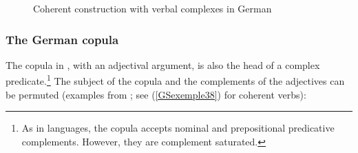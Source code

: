 \begin{figure}
{}    
    \caption{Coherent construction with verbal complexes in German}
    \label{GSfigure11}
\end{figure}



\subsubsection{The German copula}\label{GSsection4.1.3}\label{cp:sec-copula-German}

The copula in , with an adjectival argument, is also the head of a complex predicate.\footnote{As in  languages, the  copula accepts nominal and prepositional predicative complements. However, they are complement saturated.} The subject of the copula and the complements of the adjectives can be permuted (examples from \citealt[68]{Mueller2002b}; see (\ref{GSexemple38}) for coherent verbs):

